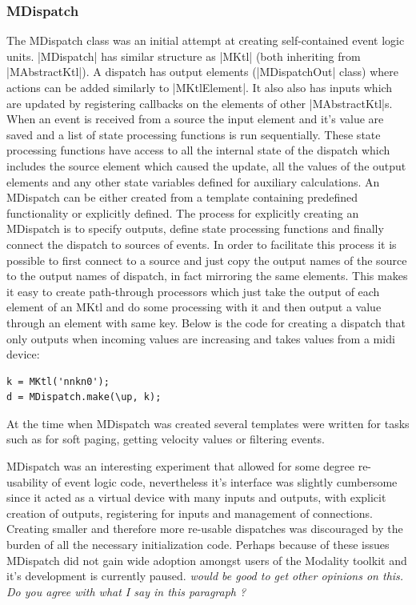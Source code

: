 \documentclass{article}
\begin{document}
	
\subsubsection{MDispatch}	

The MDispatch class was an initial attempt at creating self-contained event logic units. |MDispatch| has similar structure as |MKtl| (both inheriting from |MAbstractKtl|). A dispatch has output elements (|MDispatchOut| class) where actions can be added similarly to |MKtlElement|. It also also has inputs which are updated by registering callbacks on the elements of other |MAbstractKtl|s. When an event is received from a source the input element and it's value are saved and a list of state processing functions is run sequentially. These state processing functions have access to all the internal state of the dispatch which includes the source element which caused the update, all the values of the output elements and any other state variables defined for auxiliary calculations. An MDispatch can be either created from a template containing predefined functionality or explicitly defined. The process for explicitly creating an MDispatch is to specify outputs, define state processing functions and finally connect the dispatch to sources of events. In order to facilitate this process it is possible to first connect to a source and just copy the output names of the source to the output names of dispatch, in fact mirroring the same elements. This makes it easy to create path-through processors which just take the output of each element of an MKtl and do some processing with it and then output a value through an element with same key. Below is the code for creating a dispatch that only outputs when incoming values are increasing and takes values from a midi device:

\begin{Verbatim}
k = MKtl('nnkn0');
d = MDispatch.make(\up, k);
\end{Verbatim}

At the time when MDispatch was created several templates were written for tasks such as for soft paging, getting velocity values or filtering events. 

MDispatch was an interesting experiment that allowed for some degree re-usability of event logic code, nevertheless it's interface was slightly cumbersome since it acted as a virtual device with many inputs and outputs, with explicit creation of outputs, registering for inputs and management of connections. Creating smaller and therefore more re-usable dispatches was discouraged by the burden of all the necessary initialization code. Perhaps because of these issues MDispatch did not gain wide adoption amongst users of the Modality toolkit and it's development is currently paused. \emph{ would be good to get other opinions on this. Do you agree with what I say in this paragraph ? }
		
\end{document}
